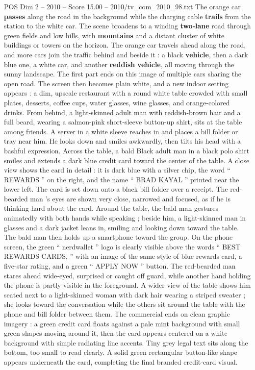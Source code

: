 \begin{textsample}{POS Dim 2 – 2010 – Score 15.00 – 2010/tv\_com\_2010\_98.txt}
The orange car \textbf{passes} along the road in the background while the charging cable \textbf{trails} from the station to the white car.
The scene broadens to a winding \textbf{two-lane} road through green fields and low hills, with \textbf{mountains} and a distant cluster of white buildings or towers on the horizon.
The orange car travels ahead along the road, and more cars join the traffic behind and beside it : a black \textbf{vehicle}, then a dark blue one, a white car, and another \textbf{reddish} \textbf{vehicle}, all moving through the sunny landscape.
The first part ends on this image of multiple cars sharing the open road.
The screen then becomes plain white, and a new indoor setting appears : a dim, upscale restaurant with a round white table crowded with small plates, desserts, coffee cups, water glasses, wine glasses, and orange-colored drinks.
From behind, a light-skinned adult man with reddish-brown hair and a full beard, wearing a salmon-pink short-sleeve button-up shirt, sits at the table among friends.
A server in a white sleeve reaches in and places a bill folder or tray near him.
He looks down and smiles awkwardly, then tilts his head with a bashful expression.
Across the table, a bald Black adult man in a black polo shirt smiles and extends a dark blue credit card toward the center of the table.
A close view shows the card in detail : it is dark blue with a silver chip, the word “ REWARDS ” on the right, and the name “ BRAD KAYAL ” printed near the lower left.
The card is set down onto a black bill folder over a receipt.
The red-bearded man ’s eyes are shown very close, narrowed and focused, as if he is thinking hard about the card.
Around the table, the bald man gestures animatedly with both hands while speaking ; beside him, a light-skinned man in glasses and a dark jacket leans in, smiling and looking down toward the table.
The bald man then holds up a smartphone toward the group.
On the phone screen, the green “ nerdwallet ” logo is clearly visible above the words “ BEST REWARDS CARDS, ” with an image of the same style of blue rewards card, a five-star rating, and a green “ APPLY NOW ” button.
The red-bearded man stares ahead wide-eyed, surprised or caught off guard, while another hand holding the phone is partly visible in the foreground.
A wider view of the table shows him seated next to a light-skinned woman with dark hair wearing a striped sweater ; she looks toward the conversation while the others sit around the table with the phone and bill folder between them.
The commercial ends on clean graphic imagery : a green credit card floats against a pale mint background with small green shapes moving around it, then the card appears centered on a white background with simple radiating line accents.
Tiny grey legal text sits along the bottom, too small to read clearly.
A solid green rectangular button-like shape appears underneath the card, completing the final branded credit-card visual.

\end{textsample}
